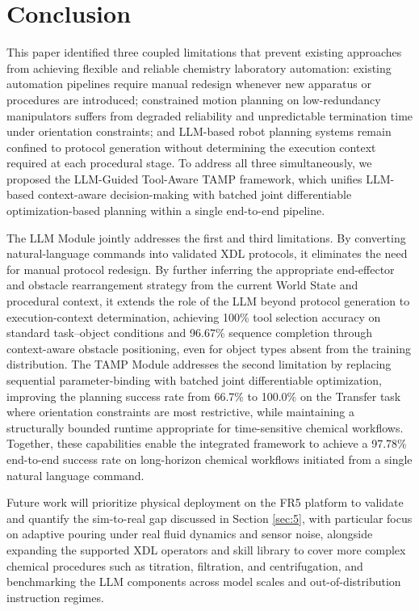 \documentclass{ieeeaccess}
\begin{document}
\section{Conclusion}\label{sec:6}
This paper identified three coupled limitations that prevent existing approaches from achieving flexible and reliable chemistry laboratory automation: existing automation pipelines require manual redesign whenever new apparatus or procedures are introduced; constrained motion planning on low-redundancy manipulators suffers from degraded reliability and unpredictable termination time under orientation constraints; and LLM-based robot planning systems remain confined to protocol generation without determining the execution context required at each procedural stage. To address all three simultaneously, we proposed the LLM-Guided Tool-Aware TAMP framework, which unifies LLM-based context-aware decision-making with batched joint differentiable optimization-based planning within a single end-to-end pipeline.

The LLM Module jointly addresses the first and third limitations. By converting natural-language commands into validated XDL protocols, it eliminates the need for manual protocol redesign. By further inferring the appropriate end-effector and obstacle rearrangement strategy from the current World State and procedural context, it extends the role of the LLM beyond protocol generation to execution-context determination, achieving 100\% tool selection accuracy on standard task--object conditions and 96.67\% sequence completion through context-aware obstacle positioning, even for object types absent from the training distribution. The TAMP Module addresses the second limitation by replacing sequential parameter-binding with batched joint differentiable optimization, improving the planning success rate from 66.7\% to 100.0\% on the Transfer task where orientation constraints are most restrictive, while maintaining a structurally bounded runtime appropriate for time-sensitive chemical workflows. Together, these capabilities enable the integrated framework to achieve a 97.78\% end-to-end success rate on long-horizon chemical workflows initiated from a single natural language command.

Future work will prioritize physical deployment on the FR5 platform to validate and quantify the sim-to-real gap discussed in Section \ref{sec:5}, with particular focus on adaptive pouring under real fluid dynamics and sensor noise, alongside expanding the supported XDL operators and skill library to cover more complex chemical procedures such as titration, filtration, and centrifugation, and benchmarking the LLM components across model scales and out-of-distribution instruction regimes.
\end{document}
